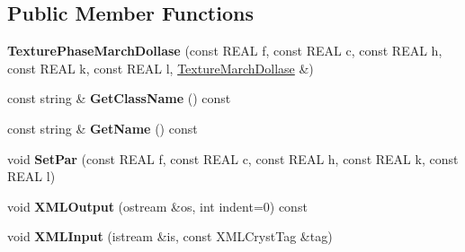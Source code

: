 \subsection*{Public Member Functions}
\begin{DoxyCompactItemize}
\item 
\mbox{\label{struct_obj_cryst_1_1_texture_phase_march_dollase_a7a17886446b42d17ba97c5f9752fd3f4}} 
{\bfseries Texture\+Phase\+March\+Dollase} (const R\+E\+AL f, const R\+E\+AL c, const R\+E\+AL h, const R\+E\+AL k, const R\+E\+AL l, \mbox{\hyperlink{class_obj_cryst_1_1_texture_march_dollase}{Texture\+March\+Dollase}} \&)
\item 
\mbox{\label{struct_obj_cryst_1_1_texture_phase_march_dollase_a0e4a1be736a82f8f5442285936b88f25}} 
const string \& {\bfseries Get\+Class\+Name} () const
\item 
\mbox{\label{struct_obj_cryst_1_1_texture_phase_march_dollase_afd4c92d58e4ba258831c434fcd37863b}} 
const string \& {\bfseries Get\+Name} () const
\item 
\mbox{\label{struct_obj_cryst_1_1_texture_phase_march_dollase_aab4457580c005e68901acb9ce34d5090}} 
void {\bfseries Set\+Par} (const R\+E\+AL f, const R\+E\+AL c, const R\+E\+AL h, const R\+E\+AL k, const R\+E\+AL l)
\item 
\mbox{\label{struct_obj_cryst_1_1_texture_phase_march_dollase_a7bb872263fe32f84bf61ef1e73058255}} 
void {\bfseries X\+M\+L\+Output} (ostream \&os, int indent=0) const
\item 
\mbox{\label{struct_obj_cryst_1_1_texture_phase_march_dollase_a8163897408ab5d08ccaf5ddb9ffd4254}} 
void {\bfseries X\+M\+L\+Input} (istream \&is, const X\+M\+L\+Cryst\+Tag \&tag)
\end{DoxyCompactItemize}
